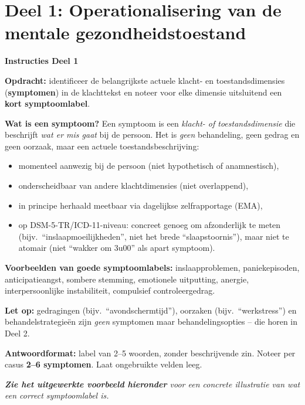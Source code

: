 \documentclass[11pt,a4paper]{article}
\begin{document}
\newpage


\section{Deel 1: Operationalisering van de mentale gezondheidstoestand}

\begin{tcolorbox}[colback=blue!3,colframe=PrimaryBlue,arc=2.5mm,boxrule=0.9pt,
  left=10pt,right=10pt,top=9pt,bottom=9pt]
\textbf{\color{PrimaryBlue}Instructies Deel 1}

\smallskip\small
\textbf{Opdracht:} identificeer de belangrijkste actuele klacht- en toestandsdimensies
(\textbf{symptomen}) in de klachttekst en noteer voor elke dimensie uitsluitend een
\textbf{kort symptoomlabel}.

\textbf{Wat is een symptoom?}
Een symptoom is een \emph{klacht- of toestandsdimensie} die beschrijft \emph{wat er
mis gaat} bij de persoon. Het is \emph{geen} behandeling, geen gedrag en geen oorzaak,
maar een actuele toestandsbeschrijving:
\begin{itemize}[topsep=2pt,itemsep=1pt]
\item momenteel aanwezig bij de persoon (niet hypothetisch of anamnestisch),
\item onderscheidbaar van andere klachtdimensies (niet overlappend),
\item in principe herhaald meetbaar via dagelijkse zelfrapportage (EMA),
\item op DSM-5-TR/ICD-11-niveau: concreet genoeg om afzonderlijk te meten (bijv.\ ``inslaapmoeilijkheden'', niet het brede ``slaapstoornis''), maar niet te atomair (niet ``wakker om 3u00'' als apart symptoom).
\end{itemize}

\textbf{Voorbeelden van goede symptoomlabels:}
inslaapproblemen, paniekepisoden, anticipatieangst, sombere stemming, emotionele uitputting,
anergie, interpersoonlijke instabiliteit, compulsief controleergedrag.

\textbf{Let op:} gedragingen (bijv.\ ``avondschermtijd''), oorzaken (bijv.\ ``werkstress'')
en behandelstrategieën zijn \emph{geen} symptomen maar behandelingsopties -- die horen in Deel 2.

\textbf{Antwoordformat:} label van 2--5 woorden, zonder beschrijvende zin.
Noteer per casus \textbf{2--6 symptomen}. Laat ongebruikte velden leeg.

\medskip
\textit{\textbf{Zie het uitgewerkte voorbeeld hieronder} voor een concrete illustratie van wat een correct symptoomlabel is.}
\end{tcolorbox}
\end{document}

